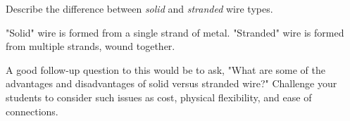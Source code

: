 

Describe the difference between {\it solid} and {\it stranded} wire types.







"Solid" wire is formed from a single strand of metal.  "Stranded" wire is formed from multiple strands, wound together.







A good follow-up question to this would be to ask, "What are some of the advantages and disadvantages of solid versus stranded wire?"  Challenge your students to consider such issues as cost, physical flexibility, and ease of connections.




